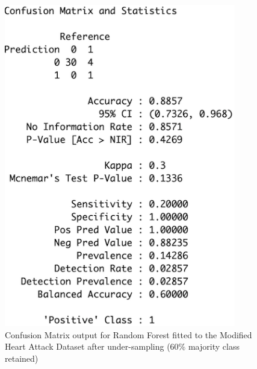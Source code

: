\begin{figure}[!htbp]
    \centering
    \begin{minipage}{0.45\textwidth}
        \centering
        \includegraphics[width=0.9\textwidth]{ThesisTemplate/appendix/images/Chapter5Appendix/ConfusionMatrix60/modHA.png}
        \caption{Confusion Matrix output for Random Forest fitted to the Modified Heart Attack Dataset after under-sampling (60\% majority class retained)}
        \label{fig:matrixmodHA60}
    \end{minipage}\hfill
    \begin{minipage}{0.45\textwidth}
        \centering

\end{minipage}
\end{figure}
